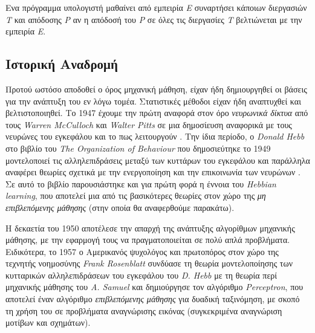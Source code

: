 \medskip
\begin{displayquote}
Ενα πρόγραμμα υπολογιστή μαθαίνει από εμπειρία \textit{Ε} συναρτήσει κάποιων διεργασιών \textit{T} και απόδοσης \textit{P} αν η απόδοσή του \textit{P} σε όλες τις διεργασίες \textit{T} βελτιώνεται με την εμπειρία \textit{E}.
\end{displayquote}

\newpage
\subsection{Ιστορική Αναδρομή}

Προτού ωστόσο αποδοθεί ο όρος μηχανική μάθηση, είχαν ήδη δημιουργηθεί οι βάσεις για την ανάπτυξη του εν λόγω τομέα. Στατιστικές μέθοδοι είχαν ήδη αναπτυχθεί και βελτιστοποιηθεί. Το 1947 έχουμε την πρώτη αναφορά στον όρο \textit{νευρωνικά δίκτυα} από τους \textit{Warren McCulloch} και \textit{Walter Pitts} σε μια δημοσίευση αναφορικά με τους νευρώνες του εγκεφάλου και το πως λειτουργούν \cite{McCulloch1943}. Την ίδια περίοδο, ο \textit{Donald Hebb} στο βιβλίο του \textit{The Organization of Behaviour} που δημοσιεύτηκε το 1949 μοντελοποιεί τις αλληλεπιδράσεις μεταξύ των κυττάρων του εγκεφάλου και παράλληλα αναφέρει θεωρίες σχετικά με την ενεργοποίηση και την επικοινωνία των νευρώνων \cite{Hebb1967}. Σε αυτό το βιβλίο παρουσιάστηκε και για πρώτη φορά η έννοια του \textit{Hebbian learning}, που αποτελεί μια από τις βασικότερες θεωρίες στον χώρο της \textit{μη επιβλεπόμενης μάθησης} (στην οποία θα αναφερθούμε παρακάτω).

\medskip
Η δεκαετία του 1950 αποτέλεσε την απαρχή της ανάπτυξης αλγορίθμων μηχανικής μάθησης, με την εφαρμογή τους να πραγματοποιείται σε πολύ απλά προβλήματα. Ειδικότερα, το 1957 ο Αμερικανός ψυχολόγος και πρωτοπόρος στον χώρο της τεχνητής νοημοσύνης \textit{Frank Rosenblatt} συνδύασε τη θεωρία μοντελοποίησης των κυτταρικών αλληλεπιδράσεων του εγκεφάλου του \textit{D. Hebb} με τη θεωρία περί μηχανικής μάθησης του \textit{A. Samuel} και δημιούργησε τον αλγόριθμο \textit{Perceptron}, που αποτελεί έναν αλγόριθμο \textit{επιβλεπόμενης μάθησης} για δυαδική ταξινόμηση, με σκοπό τη χρήση του σε προβλήματα αναγνώρισης εικόνας (συγκεκριμένα αναγνώριση μοτίβων και σχημάτων).


